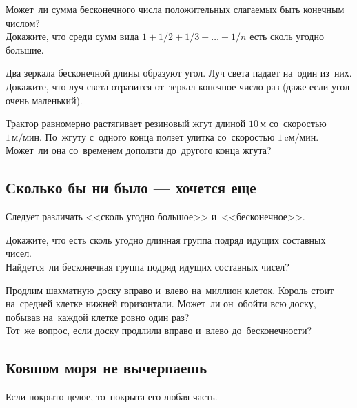 \begin{problems}

\item
\subproblem
Может~ли сумма бесконечного числа положительных слагаемых быть конечным числом?
\\
\subproblem
Докажите, что среди сумм вида $1 + 1 / 2 + 1 / 3 + \ldots + 1 / n$ есть сколь
угодно большие.

\item
Два зеркала бесконечной длины образуют угол.
Луч света падает на~один из~них.
Докажите, что луч света отразится от~зеркал конечное число раз (даже если угол
очень маленький).

\item
Трактор равномерно растягивает резиновый жгут длиной $10\,\text{м}$
со~скоростью $1\,\text{м/мин}$.
По~жгуту с~одного конца ползет улитка со~скоростью $1\,\text{cм/мин}$.
Может~ли она со~временем доползти до~другого конца жгута?

\end{problems}

\subsection*{Сколько бы ни было --- хочется еще}

Следует различать <<сколь угодно большое>> и~<<бесконечное>>.

\begin{problems}

\item
\subproblem
Докажите, что есть сколь угодно длинная группа подряд идущих составных чисел.
\\
\subproblem
Найдется~ли бесконечная группа подряд идущих составных чисел?

\item
\subproblem
Продлим шахматную доску вправо и~влево на~миллион клеток.
Король стоит на~средней клетке нижней горизонтали.
Может~ли он~обойти всю доску, побывав на~каждой клетке ровно один раз?
\\
\subproblem
Тот~же вопрос, если доску продлили вправо и~влево до~бесконечности?

\end{problems}

\subsection*{Ковшом моря не вычерпаешь}

Если покрыто целое, то~покрыта его любая часть.

